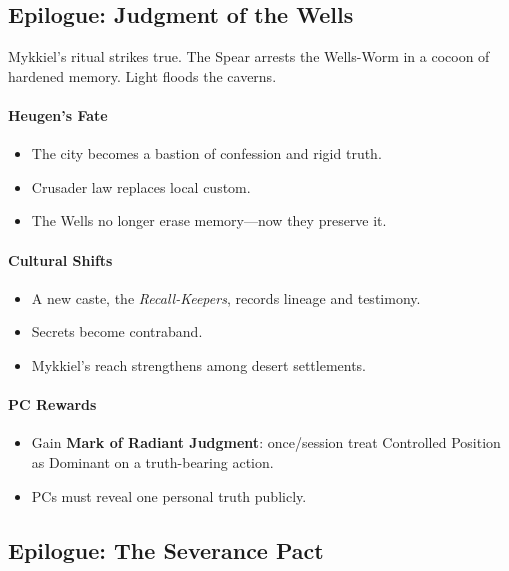 \documentclass[11pt]{book}
\begin{document}
\subsection{Epilogue: Judgment of the Wells}

Mykkiel's ritual strikes true. The Spear arrests the Wells-Worm in a
cocoon of hardened memory. Light floods the caverns.

\paragraph{Heugen's Fate}
\begin{itemize}[leftmargin=*]
    \item The city becomes a bastion of confession and rigid truth.
    \item Crusader law replaces local custom.
    \item The Wells no longer erase memory---now they preserve it.
\end{itemize}

\paragraph{Cultural Shifts}
\begin{itemize}[leftmargin=*]
    \item A new caste, the \emph{Recall-Keepers}, records lineage and testimony.
    \item Secrets become contraband.
    \item Mykkiel's reach strengthens among desert settlements.
\end{itemize}

\paragraph{PC Rewards}
\begin{itemize}[leftmargin=*]
    \item Gain \textbf{Mark of Radiant Judgment}: once/session treat Controlled Position as Dominant on a truth-bearing action.
    \item PCs must reveal one personal truth publicly.
\end{itemize}

\subsection{Epilogue: The Severance Pact}
\end{document}
